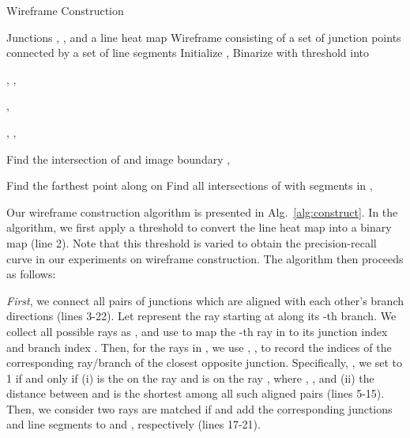 \documentclass[10pt,twocolumn,letterpaper]{article}
\begin{document}
\begin{algorithm}
	\caption{Wireframe Construction}
	\label{alg:construct}
	\begin{algorithmic}[1]
		\Require Junctions , , and a line heat map 		\Ensure Wireframe  consisting of a set of junction points  connected by a set of line segments 
		\State Initialize , 
		\State Binarize  with threshold  into 



		\For{}
		\State , , 
		
		\For{}
		\State 	
		




				\If{}
					\State , 		
				\EndIf
			\EndIf
		\EndFor
		\If{}
			\State 
		\EndIf
		
		\EndFor
		
		\ForAll{}
				\State , 
				\State , 
				\EndIf
				\EndFor
		
		\State Find the intersection of  and image boundary 
		\If{}
			\State , 
		
		\Else
			\State Find the farthest point  along  on 
			\State Find all intersections  of  with segments in 
				\State , 		
				\For{}
					\If{}
						\State 
						\State 
					\EndIf		
				\EndFor
		\EndIf
		\EndFor
	\end{algorithmic}
\end{algorithm}

Our wireframe construction algorithm is presented in Alg.~\ref{alg:construct}. In the algorithm, we first apply a threshold  to convert the line heat map  into a binary map  (line 2). Note that this threshold  is varied to obtain the precision-recall curve in our experiments on wireframe construction. The algorithm then proceeds as follows:


{\em First}, we connect all pairs of junctions which are aligned with each other's branch directions (lines 3-22).
Let  represent the ray starting at  along its -th branch. We collect all possible rays as , and use  to map the -th ray in  to its junction index  and branch index . Then, for the rays in , we use , , to record the indices of the corresponding ray/branch of the closest opposite junction. Specifically, , we set  to 1 if and only if (i)  is the on the ray  and  is on the ray , where , , and (ii) the distance between  and  is the shortest among all such aligned pairs (lines 5-15). Then, we consider two rays are matched if  and add the corresponding junctions and line segments to  and , respectively (lines 17-21).
\end{document}

